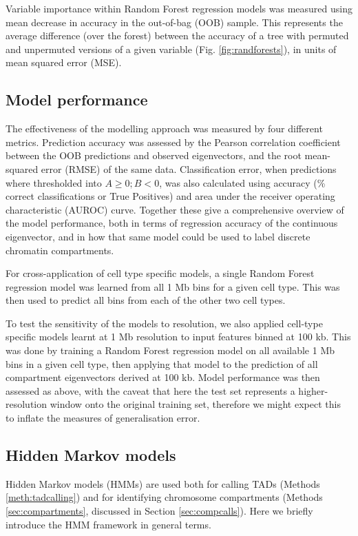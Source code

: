 \documentclass[a4paper,11pt,oneside]{book}
\begin{document}
Variable importance within Random Forest regression models was measured
using mean decrease in accuracy in the out-of-bag (OOB) sample. This
represents the average difference (over the forest) between the accuracy
of a tree with permuted and unpermuted versions of a given variable (Fig. \ref{fig:randforests}), in
units of mean squared error (MSE).\citep{Cutler2007, Dasgupta2012}

\subsection{Model performance}\label{sec:modelperf}

The effectiveness of the modelling approach was measured by four
different metrics. Prediction accuracy was assessed by the Pearson
correlation coefficient between the OOB predictions and observed eigenvectors, and the root mean-squared
error (RMSE) of the same data. Classification error, when predictions
where thresholded into $A \geq 0; B < 0$, was also calculated using
accuracy (\% correct classifications or True Positives) and area under
the receiver operating characteristic (AUROC) curve. Together these give
a comprehensive overview of the model performance, both in terms of
regression accuracy of the continuous eigenvector, and in how that same
model could be used to label discrete chromatin compartments.

For cross-application of cell type specific models, a single Random
Forest regression model was learned from all 1 Mb bins for a given cell
type. This was then used to predict all bins from each of the other two
cell types.

To test the sensitivity of the models to resolution, we also applied cell-type specific models learnt at 1 Mb resolution to input features binned at 100 kb. This was done by training a Random Forest regression model on all available 1 Mb bins in a given cell type, then applying that model to the prediction of all compartment eigenvectors derived at 100 kb. Model performance was then assessed as above, with the caveat that here the test set represents a higher-resolution window onto the original training set, therefore we might expect this to inflate the measures of generalisation error.

\subsection{Hidden Markov models}\label{meth:hmm}

Hidden Markov models (HMMs) are used both for calling TADs (Methods \ref{meth:tadcalling}) and for identifying chromosome compartments (Methods \ref{sec:compartments}, discussed in Section \ref{sec:compcalls}). Here we briefly introduce the HMM framework in general terms.
\end{document}
